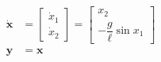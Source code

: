 \documentclass[border=0pt]{standalone}
\begin{document}
\noindent
\begin{minipage}{3.6cm}
  \begin{align*}
    \dot{\mathbf{x}} &=
    \begin{bmatrix}
      \dot{x}_1 \\
      \dot{x}_2
    \end{bmatrix}
    =
    \begin{bmatrix}
      x_2 \\
      -\dfrac{g}{\ell} \sin x_1
    \end{bmatrix} \\
    \mathbf{y} &= \mathbf{x}
  \end{align*}
\end{minipage}
\end{document}
